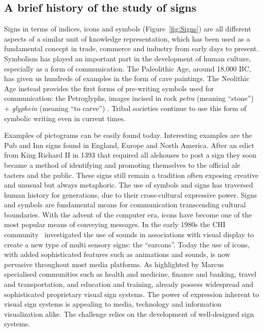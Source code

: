 \subsection{A brief history of the study of signs}
Signs in terms of indices, icons and symbols (Figure~\ref{fig:Signs}) are all different aspects of a similar unit of knowledge representation, which
has been used as a fundamental concept in trade, commerce and industry from early days to present.
Symbolism has played an important part in the development of human culture, especially as a form of communication. %
The Paleolithic Age, around 18,000 BC, has given us hundreds of examples in the form of cave paintings. 
The Neolithic Age instead provides the first forms of pre-writing symbols used for communication: the Petroglyphs, images incised in rock \emph{petra} (meaning ``stone'') + \emph{glyphein} (meaning ``to carve'') . Tribal societies continue 
to use this form of symbolic writing even in current times. 
 
Examples of pictograms can be easily found today. Interesting examples are the Pub and Inn signs found in England, Europe and North America. After an edict from King Richard II in 1393 that required all alehouses to post a sign they soon became a method of identifying and promoting themselves to the official ale tasters and the public. These signs still remain a tradition often exposing creative and unusual but always metaphoric. The use of symbols and signs has traversed human history for generations, due to their cross-cultural expressive power. Signs and symbols are fundamental means for communication transcending cultural boundaries. With the advent of the computer era, icons have become one of the most popular means of conveying messages. In the early 1980s the CHI community~\cite{Blattner1989,Bly1982,Gayer1989} investigated the use of sounds in associations with visual display to create a new type of multi sensory signs: the ``earcons''. 
Today the use of icons, with added sophisticated features such as animations and sounds, is now pervasive throughout most media platforms.  
As highlighted by Marcus~\cite{Marcus2003} specialised communities such as health and medicine, finance and banking, travel and transportation, and education
and training, already possess widespread and sophisticated proprietary visual sign systems.
The power of expression inherent to visual sign systems is appealing to media, technology and information visualization alike. 
The challenge relies on the development of well-designed sign systems. 

